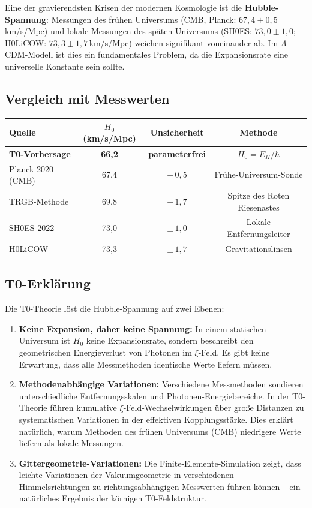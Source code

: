 	Eine der gravierendsten Krisen der modernen Kosmologie ist die \textbf{Hubble-Spannung}: Messungen des frühen Universums (CMB, Planck: $67{,}4 \pm 0{,}5\,$km/s/Mpc) und lokale Messungen des späten Universums (SH0ES: $73{,}0 \pm 1{,}0$; H0LiCOW: $73{,}3 \pm 1{,}7\,$km/s/Mpc) weichen signifikant voneinander ab. Im $\Lambda$CDM-Modell ist dies ein fundamentales Problem, da die Expansionsrate eine universelle Konstante sein sollte.
	
	\subsection{Vergleich mit Messwerten}
	
	\begin{center}
		\begin{tabular}{lccc}
			\toprule
			\textbf{Quelle} & \textbf{$H_0$ (km/s/Mpc)} & \textbf{Unsicherheit} & \textbf{Methode} \\
			\midrule
			\textbf{T0-Vorhersage} & \textbf{66{,}2} & \textbf{parameterfrei} & $H_0 = E_H/\hbar$ \\
			Planck 2020 (CMB) & 67{,}4 & $\pm\,0{,}5$ & Frühe-Universum-Sonde \\
			TRGB-Methode & 69{,}8 & $\pm\,1{,}7$ & Spitze des Roten Riesenastes \\
			SH0ES 2022 & 73{,}0 & $\pm\,1{,}0$ & Lokale Entfernungsleiter \\
			H0LiCOW & 73{,}3 & $\pm\,1{,}7$ & Gravitationslinsen \\
			\bottomrule
		\end{tabular}
	\end{center}
	
	\subsection{T0-Erklärung}
	
	Die T0-Theorie löst die Hubble-Spannung auf zwei Ebenen:
	
	\begin{enumerate}
		\item \textbf{Keine Expansion, daher keine Spannung:} In einem statischen Universum ist $H_0$ keine Expansionsrate, sondern beschreibt den geometrischen Energieverlust von Photonen im $\xi$-Feld. Es gibt keine Erwartung, dass alle Messmethoden identische Werte liefern müssen.
		
		\item \textbf{Methodenabhängige Variationen:} Verschiedene Messmethoden sondieren unterschiedliche Entfernungsskalen und Photonen-Energiebereiche. In der T0-Theorie führen kumulative $\xi$-Feld-Wechselwirkungen über große Distanzen zu systematischen Variationen in der effektiven Kopplungsstärke. Dies erklärt natürlich, warum Methoden des frühen Universums (CMB) niedrigere Werte liefern als lokale Messungen.
		
		\item \textbf{Gittergeometrie-Variationen:} Die Finite-Elemente-Simulation zeigt, dass leichte Variationen der Vakuumgeometrie in verschiedenen Himmelsrichtungen zu richtungsabhängigen Messwerten führen können -- ein natürliches Ergebnis der körnigen T0-Feldstruktur.
	\end{enumerate}
	
